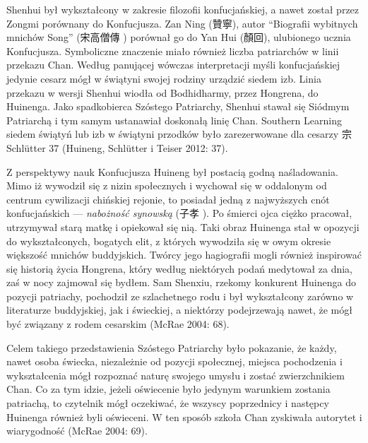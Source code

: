 Shenhui był wykształcony w zakresie filozofii konfucjańskiej, a nawet został przez Zongmi porównany do Konfucjusza. Zan Ning (贊寧), autor ``Biografii wybitnych mnichów Song'' (宋高僧傳 ) porównał go do Yan Hui (顏回), ulubionego ucznia Konfucjusza.
Symboliczne znaczenie miało również liczba patriarchów w linii przekazu Chan. Według panującej wówczas interpretacji myśli konfucjańskiej jedynie cesarz mógł w świątyni swojej rodziny urządzić siedem izb. Linia przekazu w wersji Shenhui wiodła od Bodhidharmy, przez Hongrena, do Huinenga. Jako spadkobierca Szóstego Patriarchy, Shenhui stawał się Siódmym Patriarchą i tym samym ustanawiał doskonałą linię Chan.
Southern Learning
siedem świątyń lub izb w świątyni przodków było zarezerwowane dla cesarzy
宗
Schlütter 37 \fi
(Huineng, Schlütter i Teiser 2012: 37).

Z perspektywy nauk Konfucjusza Huineng był postacią godną naśladowania.
Mimo iż wywodził się z nizin społecznych i wychował się w oddalonym od centrum cywilizacji chińskiej rejonie, to posiadał jedną z najwyższych cnót konfucjańskich --- \textit{nabożność synowską} (子孝 ).
Po śmierci ojca ciężko pracował, utrzymywał starą matkę i opiekował się nią.
Taki obraz Huinenga stał w opozycji do wykształconych, bogatych elit, z których wywodziła się w owym okresie większość mnichów buddyjskich.
Twórcy jego hagiografii mogli również inspirować się historią życia Hongrena, który według niektórych podań medytował za dnia, zaś w nocy zajmował się bydłem.
Sam Shenxiu, rzekomy konkurent Huinenga do pozycji patriachy, pochodził ze szlachetnego rodu i był wykształcony zarówno w literaturze buddyjskiej, jak i świeckiej, a niektórzy podejrzewają nawet, że mógł być związany z rodem cesarskim
(McRae 2004: 68).

Celem takiego przedstawienia Szóstego Patriarchy było pokazanie, że każdy, nawet osoba świecka, niezależnie od pozycji społecznej, miejsca pochodzenia i wykształcenia mógł rozpoznać naturę swojego umysłu i zostać zwierzchnikiem Chan.
Co za tym idzie, jeżeli oświecenie było jedynym warunkiem zostania patriachą, to czytelnik mógł oczekiwać, że wszyscy poprzednicy i następcy Huinenga również byli oświeceni.
W ten sposób szkoła Chan zyskiwała autorytet i wiarygodność (McRae 2004: 69).
